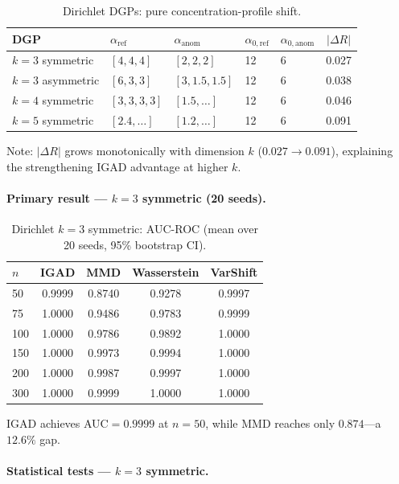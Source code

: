 \documentclass[12pt]{article}
\begin{document}
\begin{table}[h]
\centering
\caption{Dirichlet DGPs: pure concentration-profile shift.}
\begin{tabular}{lllllc}
\toprule
DGP & $\alpha_{\mathrm{ref}}$ & $\alpha_{\mathrm{anom}}$ & $\alpha_{0,\mathrm{ref}}$ & $\alpha_{0,\mathrm{anom}}$ & $|\Delta R|$ \\
\midrule
$k=3$ symmetric & $[4,4,4]$ & $[2,2,2]$ & 12 & 6 & 0.027 \\
$k=3$ asymmetric & $[6,3,3]$ & $[3,1.5,1.5]$ & 12 & 6 & 0.038 \\
$k=4$ symmetric & $[3,3,3,3]$ & $[1.5,\ldots]$ & 12 & 6 & 0.046 \\
$k=5$ symmetric & $[2.4,\ldots]$ & $[1.2,\ldots]$ & 12 & 6 & 0.091 \\
\bottomrule
\end{tabular}
\end{table}

Note: $|\Delta R|$ grows monotonically with dimension $k$ ($0.027\to 0.091$),
explaining the strengthening IGAD advantage at higher $k$.

\paragraph{Primary result --- $k=3$ symmetric (20 seeds).}

\begin{table}[h]
\centering
\caption{Dirichlet $k=3$ symmetric: AUC-ROC (mean over 20 seeds, 95\% bootstrap CI).}
\begin{tabular}{lcccc}
\toprule
$n$ & IGAD & MMD & Wasserstein & VarShift \\
\midrule
50  & 0.9999 & 0.8740 & 0.9278 & 0.9997 \\
75  & 1.0000 & 0.9486 & 0.9783 & 0.9999 \\
100 & 1.0000 & 0.9786 & 0.9892 & 1.0000 \\
150 & 1.0000 & 0.9973 & 0.9994 & 1.0000 \\
200 & 1.0000 & 0.9987 & 0.9997 & 1.0000 \\
300 & 1.0000 & 0.9999 & 1.0000 & 1.0000 \\
\bottomrule
\end{tabular}
\end{table}

IGAD achieves AUC$=0.9999$ at $n=50$, while MMD reaches only $0.874$---a
$12.6\%$ gap.

\paragraph{Statistical tests --- $k=3$ symmetric.}
\end{document}
